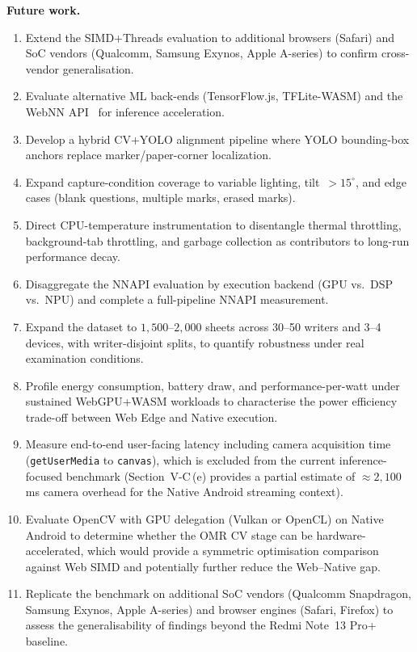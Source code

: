 \documentclass[conference]{IEEEtran}
\begin{document}
\textbf{Future work.}
\begin{enumerate}[label=\alph*., leftmargin=*, itemsep=2pt, topsep=4pt]
  \item Extend the SIMD+Threads evaluation to additional browsers
    (Safari) and SoC vendors (Qualcomm, Samsung Exynos, Apple A-series)
    to confirm cross-vendor generalisation.
  \item Evaluate alternative ML back-ends (TensorFlow.js, TFLite-WASM)
    and the WebNN API~\cite{webnn2024} for inference acceleration.
  \item Develop a hybrid CV+YOLO alignment pipeline where YOLO
    bounding-box anchors replace marker/paper-corner localization.
  \item Expand capture-condition coverage to variable lighting,
    tilt~$>15^\circ$, and edge cases (blank questions, multiple marks,
    erased marks).
  \item Direct CPU-temperature instrumentation to disentangle thermal
    throttling, background-tab throttling, and garbage collection as
    contributors to long-run performance decay.
  \item Disaggregate the NNAPI evaluation by execution backend (GPU
    vs.\ DSP vs.\ NPU) and complete a full-pipeline NNAPI measurement.
  \item Expand the dataset to $1{,}500$--$2{,}000$ sheets across
    30--50 writers and 3--4 devices, with writer-disjoint splits, to
    quantify robustness under real examination conditions.
  \item Profile energy consumption, battery draw, and performance-per-watt
    under sustained WebGPU+WASM workloads to characterise the power
    efficiency trade-off between Web Edge and Native execution.
  \item Measure end-to-end user-facing latency including camera
    acquisition time (\texttt{getUserMedia} to \texttt{canvas}),
    which is excluded from the current inference-focused benchmark
    (Section~V-C\,(e) provides a partial estimate of $\approx2{,}100$\,ms
    camera overhead for the Native Android streaming context).
  \item Evaluate OpenCV with GPU delegation (Vulkan or OpenCL) on
    Native Android to determine whether the OMR CV stage can be
    hardware-accelerated, which would provide a symmetric optimisation
    comparison against Web SIMD and potentially further reduce the
    Web--Native gap.
  \item Replicate the benchmark on additional SoC vendors (Qualcomm
    Snapdragon, Samsung Exynos, Apple A-series) and browser engines
    (Safari, Firefox) to assess the generalisability of findings beyond
    the Redmi Note~13 Pro+ baseline.
\end{enumerate}
\end{document}
